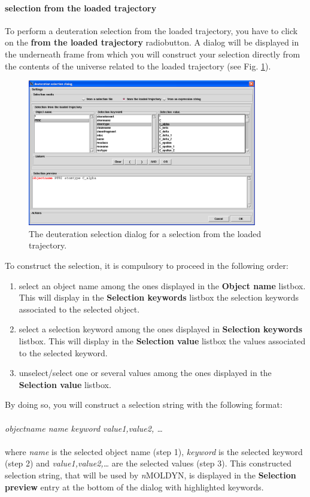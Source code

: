 \documentclass[a4paper,11pt]{report}
\newcommand{\NMOLDYN}{\textit{n}MOLDYN}
\begin{document}
\paragraph{selection from the loaded trajectory\\}
To perform a deuteration selection from the loaded trajectory, you have to click on the \textbf{from the loaded trajectory} 
radiobutton. A dialog will be displayed in the underneath frame from which you will construct your selection directly from 
the contents of the universe related to the loaded trajectory (see Fig. \ref{fig:deuteration_selection_from_the_loaded_trajectory}).
\begin{figure}[h!]
\begin{center}
\includegraphics[width=10cm]{Figures/deuteration_selection_from_the_loaded_trajectory.eps}
\end{center}
\caption[The deuteration selection dialog for a selection from the loaded trajectory]{The deuteration selection dialog for a selection from the loaded trajectory.}
\label{fig:deuteration_selection_from_the_loaded_trajectory}
\end{figure}   

To construct the selection, it is compulsory to proceed in the following order:
\begin{enumerate}
\item select an object name among the ones displayed in the \textbf{Object name} listbox. This will 
display in the \textbf{Selection keywords} listbox the selection keywords associated to the selected object.
\item select a selection keyword among the ones displayed in \textbf{Selection keywords} listbox. This will display in the 
\textbf{Selection value} listbox the values associated to the selected keyword.
\item unselect/select one or several values among the ones displayed in the \textbf{Selection value} listbox.
\end{enumerate}
By doing so, you will construct a selection string with the following format:
\\\\
\textit{objectname name keyword value1,value2, \ldots}
\\\\
where \textit{name} is the selected object name (step 1), \textit{keyword} is the selected keyword (step 2) and 
\textit{value1,value2,\ldots} are the selected values (step 3). This constructed selection string, that will be used by 
\NMOLDYN , is displayed in the \textbf{Selection preview} entry at the bottom of the dialog with highlighted keywords. 
\end{document}
